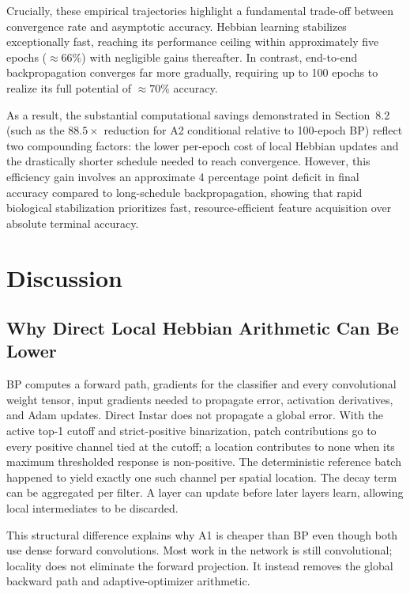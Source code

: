 \documentclass{article}
\begin{document}
    Crucially, these empirical trajectories highlight a fundamental trade-off between convergence rate and asymptotic accuracy. Hebbian learning stabilizes exceptionally fast, reaching its performance ceiling within approximately five epochs ($\approx 66\%$) with negligible gains thereafter. In contrast, end-to-end backpropagation converges far more gradually, requiring up to 100 epochs to realize its full potential of $\approx 70\%$ accuracy.
    
    As a result, the substantial computational savings demonstrated in Section~8.2 (such as the $88.5\times$ reduction for A2 conditional relative to 100-epoch BP) reflect two compounding factors: the lower per-epoch cost of local Hebbian updates and the drastically shorter schedule needed to reach convergence. However, this efficiency gain involves an approximate 4 percentage point deficit in final accuracy compared to long-schedule backpropagation, showing that rapid biological stabilization prioritizes fast, resource-efficient feature acquisition over absolute terminal accuracy.
    
    \section{Discussion}
    
    \subsection{Why Direct Local Hebbian Arithmetic Can Be Lower}
    
    BP computes a forward path, gradients for the classifier and every convolutional weight tensor, input gradients needed to propagate error, activation derivatives, and Adam updates. Direct Instar does not propagate a global error. With the active top-1 cutoff and strict-positive binarization, patch contributions go to every positive channel tied at the cutoff; a location contributes to none when its maximum thresholded response is non-positive. The deterministic reference batch happened to yield exactly one such channel per spatial location. The decay term can be aggregated per filter. A layer can update before later layers learn, allowing local intermediates to be discarded.
    
    This structural difference explains why A1 is cheaper than BP even though both use dense forward convolutions. Most work in the network is still convolutional; locality does not eliminate the forward projection. It instead removes the global backward path and adaptive-optimizer arithmetic.
    
\end{document}
